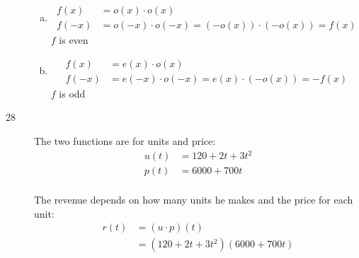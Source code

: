 \documentclass{exam}
\begin{document}
\begin{description}
\begin{enumerate}[(a)]
\item
\begin{align*}
  f(x) &= o(x) \cdot o(x) \\
  f(-x) &= o(-x) \cdot o(-x) = (- o(x)) \cdot (- o(x)) = f(x)
\end{align*}
$f$ is even

\item
\begin{align*}
  f(x) &= e(x) \cdot o(x) \\
  f(-x) &= e(-x) \cdot o(-x) = e(x) \cdot (- o(x)) = -f(x)
\end{align*}
$f$ is odd

\end{enumerate}

\item[28]
The two functions are for units and price:
\begin{align*}
  u(t) &= 120 + 2t + 3t^2 \\
  p(t) &= 6000 + 700t \\
\end{align*}

The revenue depends on how many units he makes and the price for each unit:
\begin{align*}
  r(t) &= (u \cdot p)(t) \\
       &= (120 + 2t + 3t^2)(6000 + 700t) \\
\end{align*}

\end{description}

\pagebreak
\end{document}
